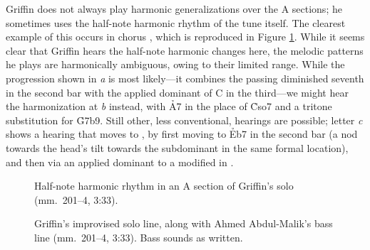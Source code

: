 Griffin does not always play harmonic generalizations over the A sections; he
sometimes uses the half-note harmonic rhythm of the tune itself. The
clearest example of this occurs in chorus , which is reproduced in Figure
\ref{ran:jg-change-running}. While it seems clear that Griffin hears the
half-note harmonic changes here, the melodic patterns he plays are harmonically
ambiguous, owing to their limited range. While the progression shown in
\emph{a} is most likely---it combines the passing diminished seventh in the
second bar with the applied dominant of C in the third---we might hear the
harmonization at \emph{b} instead, with \h{A7} in the place of \h{Cso7} and a
tritone substitution for \h{G7b9}. Still other, less conventional, hearings
are possible; letter \emph{c} shows a hearing that moves to \Eflat, by first
moving to \h{Eb7} in the second bar (a nod towards the head's tilt towards the
subdominant in the same formal location), and then via an applied dominant to
a modified \tfo in \Eflat.

\begin{figure}[tbp]
  \caption[Half-note harmonic rhythm in an A section of Griffin's solo.]{%
    Half-note harmonic rhythm in an A section of Griffin's solo (mm.~201--4,
    3:33).}
  \label{ran:jg-change-running}
\end{figure}

\begin{figure}[tbp]
  \caption[Griffin's improvised solo line, along with Ahmed Abdul-Malik's bass
  line.]{Griffin's improvised solo line, along with Ahmed Abdul-Malik's bass line
    (mm.~201--4, 3:33). Bass sounds as written.}
  \label{ran:change-running-bass}
\end{figure}

